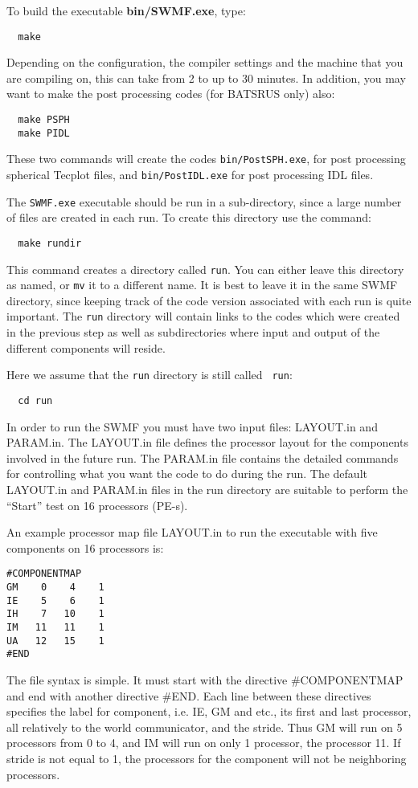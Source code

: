 To build the executable {\bf bin/SWMF.exe}, type:
\begin{verbatim}
  make
\end{verbatim} 
Depending on the configuration, the compiler settings and the machine 
that you are compiling on, this can take from 2 to up to 30 minutes.  
In addition, you may want to make the post processing
codes (for BATSRUS only) also:
\begin{verbatim}
  make PSPH
  make PIDL
\end{verbatim} 
These two commands will create the codes {\tt bin/PostSPH.exe}, for post
processing spherical Tecplot files, and {\tt bin/PostIDL.exe} 
for post processing IDL files.

The {\tt SWMF.exe} executable should be run in a sub-directory, since a large number
of files are created in each run.  To create this directory use the
command:
\begin{verbatim}
  make rundir
\end{verbatim} 
This command creates a directory called {\tt run}.  You can either
leave this directory as named, or {\tt mv} it to a different name.  It
is best to leave it in the same SWMF directory, since
keeping track of the code version associated with each run is quite
important.  The {\tt run} directory will contain links to the codes
which were created in the previous step as well as subdirectories
where input and output of the different components will reside.

Here we assume that the {\tt run} directory is still called {\tt
run}:
\begin{verbatim}
  cd run
\end{verbatim}
In order to run the SWMF you must have two input files:  LAYOUT.in and
PARAM.in.  The LAYOUT.in file defines the processor
layout for the components involved in the future run.  The PARAM.in
file contains the detailed commands for controlling what you want the
code to do during the run.  The default LAYOUT.in and PARAM.in
files in the run directory are suitable to perform the ``Start'' test
on 16 processors (PE-s). 

An example processor map file LAYOUT.in to run the executable with
five components on 16 processors is:
\begin{verbatim}
#COMPONENTMAP
GM    0    4    1
IE    5    6    1
IH    7   10    1
IM   11   11    1
UA   12   15    1
#END
\end{verbatim}
The file syntax is simple. It must start with the directive
\#COMPONENTMAP and end with another directive \#END. Each line between
these directives specifies the label for component, i.e. IE, GM and
etc., its first and last processor, all relatively to the world
communicator, and the stride. Thus GM will run on 5 processors from 0
to 4, and IM will run on only 1 processor, the processor 11.  If
stride is not equal to 1, the processors for the component will not be
neighboring processors.

